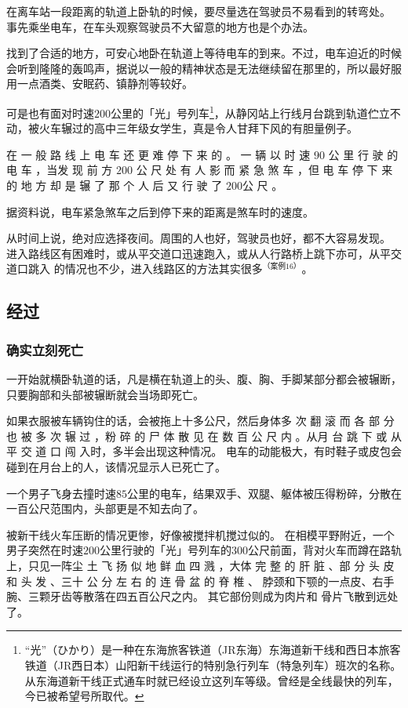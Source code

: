 \documentclass[UTF8]{ctexart}
\begin{document}
在离车站一段距离的轨道上卧轨的时候，要尽量选在驾驶员不易看到的转弯处。
事先乘坐电车，在车头观察驾驶员不大留意的地方也是个办法。

找到了合适的地方，可安心地卧在轨道上等待电车的到来。不过，电车迫近的时候会听到隆隆的轰鸣声，据说以一般的精神状态是无法继续留在那里的，所以最好服用一点酒类、安眠药、镇静剂等较好。

可是也有面对时速$200$公里的「光」号列车\footnote{“光”（ひかり）是一种在东海旅客铁道（JR东海）东海道新干线和西日本旅客铁道（JR西日本）山阳新干线运行的特别急行列车（特急列车）班次的名称。从东海道新干线正式通车时就已经设立这列车等级。曾经是全线最快的列车，今已被希望号所取代。}，从静冈站上行线月台跳到轨道伫立不动，被火车辗过的高中三年级女学生，真是令人甘拜下风的有胆量例子。

在 一 般 路 线 上 电 车 还 更 难 停 下 来 的 。
一 辆 以 时 速 $90$ 公 里 行 驶 的 电 车 ，当发 现 前 方 $200$ 公 尺 处 有 人 影 而 紧 急 煞 车 ，但 电 车 停 下 来 的 地 方 却 是 辗 了 那 个 人 后 又 行 驶 了 $200$公 尺 。

据资料说，电车紧急煞车之后到停下来的距离是煞车时的速度。

从时间上说，绝对应选择夜间。周围的人也好，驾驶员也好，都不大容易发现。 
进入路线区有困难时，或从平交道口迅速跑入，或从人行路桥上跳下亦可，从平交道口跳入 的情况也不少，进入线路区的方法其实很多$^{（案例 16）}$。

\subsection{经过}

\subsubsection*{确实立刻死亡}

一开始就横卧轨道的话，凡是横在轨道上的头、腹、胸、手脚某部分都会被辗断，只要胸部和头部被辗断就会当场即死亡。

如果衣服被车辆钩住的话，会被拖上十多公尺，然后身体多 次 翻 滚 而 各 部 分 也 被 多 次 辗 过 ，粉 碎 的 尸 体 散 见 在 数 百 公 尺 内 。从月 台 跳 下 或 从 平 交 道 口 闯 入时，多半会出现这种情况。 电车的动能极大，有时鞋子或皮包会碰到在月台上的人，该情况显示人已死亡了。

一个男子飞身去撞时速$85$公里的电车，结果双手、双腿、躯体被压得粉碎，分散在一百公尺范围内，头部更是不知去向了。

被新干线火车压断的情况更惨，好像被搅拌机搅过似的。
在相模平野附近，一个男子突然在时速$200$公里行驶的「光」号列车的$300$公尺前面，背对火车而蹲在路轨上，只见一阵尘 土 飞 扬 似 地 鲜 血 四 溅 ，大体 完 整 的 肝 脏 、部 分 头 皮 和 头 发 、三十 公 分 左 右 的 连 骨 盆 的 脊 椎 、 脖颈和下颚的一点皮、右手腕、三颗牙齿等散落在四五百公尺之内。
其它部份则成为肉片和 骨片飞散到远处了。
\end{document}
